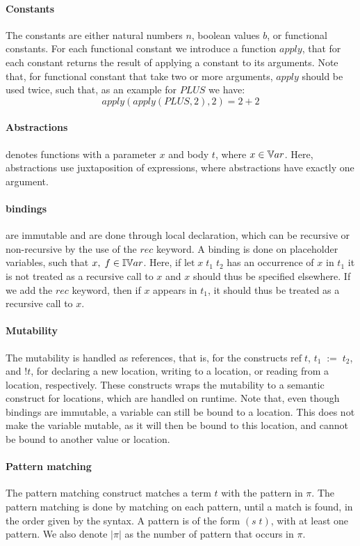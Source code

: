 \documentclass[../../master.tex]{subfiles}
\begin{document}
\paragraph{Constants}
The constants are either natural numbers $n$, boolean values $b$, or functional constants.
For each functional constant we introduce a function $apply$, that for each constant returns the result of applying a constant to its arguments.
Note that, for functional constant that take two or more arguments, $apply$ should be used twice, such that, as an example for $PLUS$ we have:
$$apply(apply(PLUS,2),2)=2+2$$

\paragraph{Abstractions}
denotes functions with a parameter $x$ and body $t$, where $x\in\mathbb{V}ar$.
Here, abstractions use juxtaposition of expressions, where abstractions have exactly one argument.

\paragraph{bindings}
are immutable and are done through local declaration, which can be recursive or non-recursive by the use of the $rec$ keyword.
A binding is done on placeholder variables, such that $x,\;f\in\mathbb{IV}ar$.
Here, if $\mbox{let}\;x\;t_1\;t_2$ has an occurrence of $x$ in $t_1$ it is not treated as a recursive call to $x$ and $x$ should thus be specified elsewhere.
If we add the $rec$ keyword, then if $x$ appears in $t_1$, it should thus be treated as a recursive call to $x$.

\paragraph{Mutability}
The mutability is handled as references, that is, for the constructs $\mbox{ref}\;t$, $t_1\;:=\;t_2$, and $!t$, for declaring a new location, writing to a location, or reading from a location, respectively.
These constructs wraps the mutability to a semantic construct for locations, which are handled on runtime.
Note that, even though bindings are immutable, a variable can still be bound to a location.
This does not make the variable mutable, as it will then be bound to this location, and cannot be bound to another value or location.

\paragraph{Pattern matching}
The pattern matching construct matches a term $t$ with the pattern in $\pi$.
The pattern matching is done by matching on each pattern, until a match is found, in the order given by the syntax.
A pattern is of the form $(s\;t)$, with at least one pattern.
We also denote $|\pi|$ as the number of pattern that occurs in $\pi$.
\end{document}
